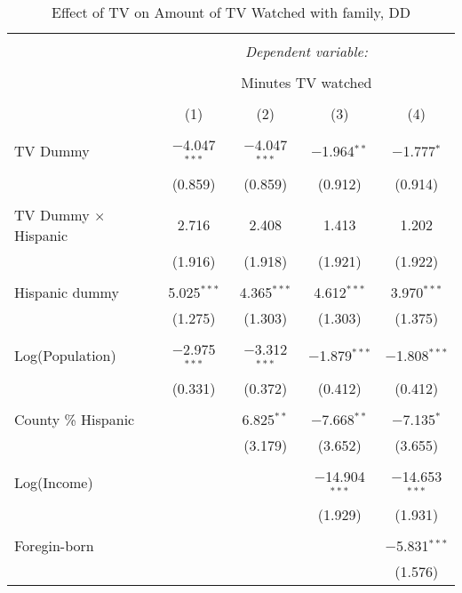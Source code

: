 
\begin{table}[!htbp] \centering 
  \caption{Effect of TV on Amount of TV Watched with family, DD} 
  \label{} 
\begin{tabular}{@{\extracolsep{-5pt}}lcccc} 
\\[-1.8ex]\hline 
\hline \\[-1.8ex] 
 & \multicolumn{4}{c}{\textit{Dependent variable:}} \\ 
\cline{2-5} 
\\[-1.8ex] & \multicolumn{4}{c}{Minutes TV watched} \\ 
\\[-1.8ex] & (1) & (2) & (3) & (4)\\ 
\hline \\[-1.8ex] 
 TV Dummy & $-$4.047$^{***}$ & $-$4.047$^{***}$ & $-$1.964$^{**}$ & $-$1.777$^{*}$ \\ 
  & (0.859) & (0.859) & (0.912) & (0.914) \\ 
  & & & & \\ 
 TV Dummy $\times$ Hispanic  & 2.716 & 2.408 & 1.413 & 1.202 \\ 
  & (1.916) & (1.918) & (1.921) & (1.922) \\ 
  & & & & \\ 
 Hispanic dummy & 5.025$^{***}$ & 4.365$^{***}$ & 4.612$^{***}$ & 3.970$^{***}$ \\ 
  & (1.275) & (1.303) & (1.303) & (1.375) \\ 
  & & & & \\ 
 Log(Population) & $-$2.975$^{***}$ & $-$3.312$^{***}$ & $-$1.879$^{***}$ & $-$1.808$^{***}$ \\ 
  & (0.331) & (0.372) & (0.412) & (0.412) \\ 
  & & & & \\ 
 County \% Hispanic &  & 6.825$^{**}$ & $-$7.668$^{**}$ & $-$7.135$^{*}$ \\ 
  &  & (3.179) & (3.652) & (3.655) \\ 
  & & & & \\ 
 Log(Income) &  &  & $-$14.904$^{***}$ & $-$14.653$^{***}$ \\ 
  &  &  & (1.929) & (1.931) \\ 
  & & & & \\ 
 Foregin-born &  &  &  & $-$5.831$^{***}$ \\ 
  &  &  &  & (1.576) \\ 

\end{tabular}
\end{table}
